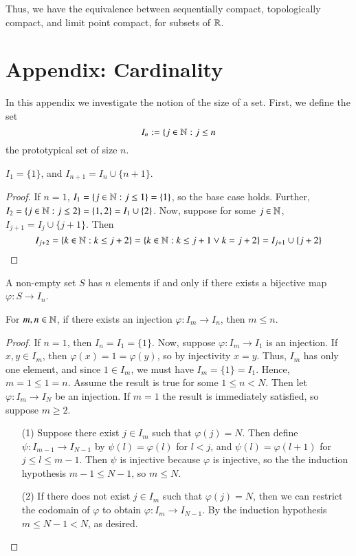 Thus, we have the equivalence between sequentially compact, topologically compact, and limit point compact, for subsets of $\mathbb R$.




%
\section*{Appendix: Cardinality}
%

In this appendix we investigate the notion of the size of a set. First, we define the set $$I_n := \{j \in \mathbb N:j \leq n$$ the prototypical set of size $n$.

\begin{lemma}
    $I_1 = \{1\}$, and $I_{n+1} = I_n \cup \{n+1\}$.
\end{lemma}
\begin{proof}
    If $n  =1$, $I_1 = \{j \in \mathbb N: j \leq 1\} = \{1\}$, so the base case holds. Further, $I_2 = \{j \in \mathbb N:j \leq 2\} = \{1,2\} = I_1 \cup\{2\}$. Now, suppose for some $j \in \mathbb N$, $I_{j+1} = I_j \cup\{j+1\}$. Then $$I_{j+2} = \{k \in \mathbb N:k\leq j+2\} = \{k \in \mathbb N:k\leq j+1\lor k = j+2\} = I_{j+1}\cup \{j+2\}$$
\end{proof}

\begin{definition}
    A non-empty set $S$ has $n$ elements if and only if there exists a bijective map $\varphi:S\rightarrow I_n$.
\end{definition}

\begin{proposition}\label{prop:1.8.2}
    For $m,n \in \mathbb N$, if there exists an injection $\varphi:I_m\rightarrow I_n$, then $m \leq n$.
\end{proposition}
\begin{proof}
    If $n = 1$, then $I_n = I_1 = \{1\}$. Now, suppose $\varphi:I_m\rightarrow I_1$ is an injection. If $x,y \in I_m$, then $\varphi(x) = 1 = \varphi(y)$, so by injectivity $x = y$. Thus, $I_m$ has only one element, and since $1 \in I_m$, we must have $I_m = \{1\} = I_1$. Hence, $m = 1 \leq 1 = n$. Assume the result is true for some $1 \leq n < N$. Then let $\varphi:I_m\rightarrow I_N$ be an injection. If $m = 1$ the result is immediately satisfied, so suppose $m \geq 2$. 
    \begin{itemize}
        \item[(1)] Suppose there exist $j \in I_m$ such that $\varphi(j) = N$. Then define $\psi:I_{m-1}\rightarrow I_{N-1}$ by $\psi(l) = \varphi(l)$ for $l < j$, and $\psi(l) = \varphi(l+1)$ for $j \leq l \leq m-1$. Then $\psi$ is injective because $\varphi$ is injective, so the the induction hypothesis $m-1 \leq N-1$, so $m \leq N$.
        \item[(2)] If there does not exist $j \in I_m$ such that $\varphi(j) = N$, then we can restrict the codomain of $\varphi$ to obtain $\varphi:I_m\rightarrow I_{N-1}$. By the induction hypothesis $m \leq N-1 < N$, as desired.
    \end{itemize}
\end{proof}

